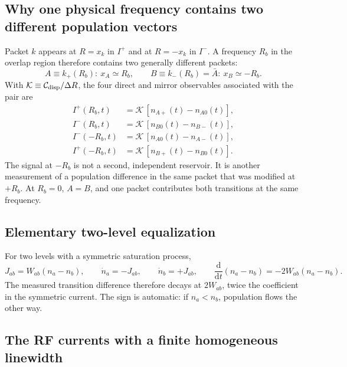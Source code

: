 \documentclass[11pt]{article}
\newcommand{\Iplus}{I^{+}}
\newcommand{\Iminus}{I^{-}}
\newcommand{\dd}{\mathrm{d}}
\begin{document}
\subsection{Why one physical frequency contains two different population vectors}

Packet \(k\) appears at \(R=x_k\) in \(\Iplus\) and at \(R=-x_k\) in \(\Iminus\). A frequency
\(R_b\) in the overlap region therefore contains two generally different packets:
\begin{equation}
  A\equiv k_{+}(R_b):\ x_A\simeq R_b,
  \qquad
  B\equiv k_{-}(R_b)=\bar A:\ x_B\simeq -R_b .
  \label{eq:app-packet-AB}
\end{equation}
With \(\mathcal K\equiv\mathcal C_{\rm disp}/\Delta R\), the four direct and mirror observables
associated with the pair are
\begin{align}
  \Iplus(R_b,t)
    &=\mathcal K\,[n_{A+}(t)-n_{A0}(t)],
  \label{eq:app-Iplus-direct}\\
  \Iminus(R_b,t)
    &=\mathcal K\,[n_{B0}(t)-n_{B-}(t)],
  \label{eq:app-Iminus-direct}\\
  \Iminus(-R_b,t)
    &=\mathcal K\,[n_{A0}(t)-n_{A-}(t)],
  \label{eq:app-Iminus-mirror}\\
  \Iplus(-R_b,t)
    &=\mathcal K\,[n_{B+}(t)-n_{B0}(t)].
  \label{eq:app-Iplus-mirror}
\end{align}
The signal at \(-R_b\) is not a second, independent reservoir. It is another measurement of a
population difference in the same packet that was modified at \(+R_b\). At \(R_b=0\), \(A=B\),
and one packet contributes both transitions at the same frequency.

\subsection{Elementary two-level equalization}

For two levels with a symmetric saturation process,
\begin{equation}
  J_{ab}=W_{ab}(n_a-n_b),\qquad \dot n_a=-J_{ab},\qquad \dot n_b=+J_{ab},\qquad
  \frac{\dd}{\dd t}(n_a-n_b)=-2W_{ab}(n_a-n_b).
  \label{eq:app-twolevel}
\end{equation}
The measured transition difference therefore decays at \(2W_{ab}\), twice the coefficient in the
symmetric current. The sign is automatic: if \(n_a<n_b\), population flows the other way.

\subsection{The RF currents with a finite homogeneous linewidth}
\end{document}
